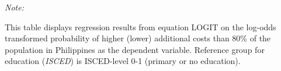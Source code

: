\begin{table}[htbp!]
\begin{adjustbox}{width = 1\textwidth, max height = 0.95\textheight, center}
\begin{threeparttable}[b]
         \begin{tablenotes}\item \medskip \textit{Note:}
            \item This table displays regression results from equation LOGIT on the log-odds transformed probability of higher (lower) additional costs than 80\% of the population in Philippines as the dependent variable. Reference group for education (\textit{ISCED}) is ISCED-level 0-1 (primary or no education).
         \end{tablenotes}
      \end{threeparttable}
   \end{adjustbox}
\end{table}


